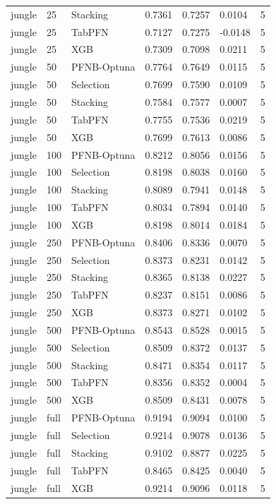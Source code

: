 \begin{tabular}{llllllr}
jungle & 25 & Stacking & 0.7361 & 0.7257 & 0.0104 & 5 \\
jungle & 25 & TabPFN & 0.7127 & 0.7275 & -0.0148 & 5 \\
jungle & 25 & XGB & 0.7309 & 0.7098 & 0.0211 & 5 \\
jungle & 50 & PFNB-Optuna & 0.7764 & 0.7649 & 0.0115 & 5 \\
jungle & 50 & Selection & 0.7699 & 0.7590 & 0.0109 & 5 \\
jungle & 50 & Stacking & 0.7584 & 0.7577 & 0.0007 & 5 \\
jungle & 50 & TabPFN & 0.7755 & 0.7536 & 0.0219 & 5 \\
jungle & 50 & XGB & 0.7699 & 0.7613 & 0.0086 & 5 \\
jungle & 100 & PFNB-Optuna & 0.8212 & 0.8056 & 0.0156 & 5 \\
jungle & 100 & Selection & 0.8198 & 0.8038 & 0.0160 & 5 \\
jungle & 100 & Stacking & 0.8089 & 0.7941 & 0.0148 & 5 \\
jungle & 100 & TabPFN & 0.8034 & 0.7894 & 0.0140 & 5 \\
jungle & 100 & XGB & 0.8198 & 0.8014 & 0.0184 & 5 \\
jungle & 250 & PFNB-Optuna & 0.8406 & 0.8336 & 0.0070 & 5 \\
jungle & 250 & Selection & 0.8373 & 0.8231 & 0.0142 & 5 \\
jungle & 250 & Stacking & 0.8365 & 0.8138 & 0.0227 & 5 \\
jungle & 250 & TabPFN & 0.8237 & 0.8151 & 0.0086 & 5 \\
jungle & 250 & XGB & 0.8373 & 0.8271 & 0.0102 & 5 \\
jungle & 500 & PFNB-Optuna & 0.8543 & 0.8528 & 0.0015 & 5 \\
jungle & 500 & Selection & 0.8509 & 0.8372 & 0.0137 & 5 \\
jungle & 500 & Stacking & 0.8471 & 0.8354 & 0.0117 & 5 \\
jungle & 500 & TabPFN & 0.8356 & 0.8352 & 0.0004 & 5 \\
jungle & 500 & XGB & 0.8509 & 0.8431 & 0.0078 & 5 \\
jungle & full & PFNB-Optuna & 0.9194 & 0.9094 & 0.0100 & 5 \\
jungle & full & Selection & 0.9214 & 0.9078 & 0.0136 & 5 \\
jungle & full & Stacking & 0.9102 & 0.8877 & 0.0225 & 5 \\
jungle & full & TabPFN & 0.8465 & 0.8425 & 0.0040 & 5 \\
jungle & full & XGB & 0.9214 & 0.9096 & 0.0118 & 5 \\
\bottomrule
\end{tabular}
